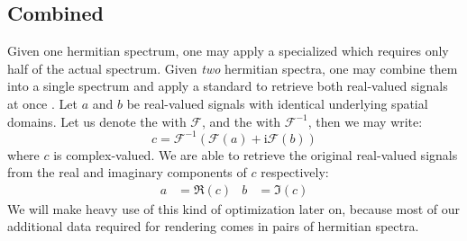 \subsection{Combined \InvFourierTransform}
Given one hermitian spectrum, one may apply a specialized \InvFourierTransform
which requires only half of the actual spectrum. Given \emph{two} hermitian spectra,
one may combine them into a single spectrum and apply a standard \InvFourierTransform
to retrieve both real-valued signals at once \citep{fft:handbook}.
Let $a$ and $b$ be real-valued signals with identical underlying spatial domains.
Let us denote the \FourierTransform with $\mathcal{F}$, and the \InvFourierTransform
with $\mathcal{F}^{-1}$, then we may write:
\begin{equation}
\label{eq:idft:combined}
c = \mathcal{F}^{-1}(\mathcal{F}(a)+\mathrm{i}\mathcal{F}(b))
\end{equation}
where $c$ is complex-valued. We are able to retrieve the original real-valued
signals from the real and imaginary components of $c$ respectively:
\begin{align*}
a &= \Re(c) & b &= \Im(c)
\end{align*}
%
We will make heavy use of this kind of optimization later on, because most
of our additional data required for rendering comes in pairs of hermitian spectra.
